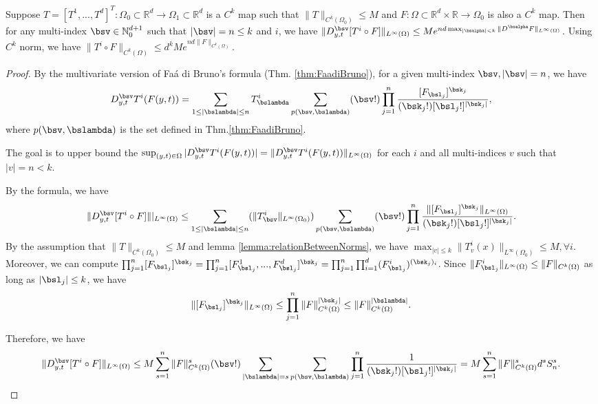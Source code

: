 \begin{theorem}\label{thm:compositionVelocityFieldNorm}
Suppose $T = [T^1, ..., T^d]^T:\Omega_0\subset\mathbb{R}^d\rightarrow\Omega_1\subset\mathbb{R}^d$ is a $C^k$ map such that $\|T\|_{C^k(\Omega_0)} \leq M$ and $F:\Omega\subset\mathbb{R}^d\times\mathbb{R}\rightarrow\Omega_0$ is also a $C^k$ map. Then for any multi-index $\bsv\in\mathbb{N}_0^{d+1}$ such that $|\bsv| = n \leq k$ and $i$, we have $\|D^\bsv_{y,t}[T^i\circ F]\|_{L^\infty(\Omega)} \leq Me^{nd\max_{|\bsalpha|<k}\|D^\bsalpha F\|_{L^\infty(\Omega)} } $. Using $C^k$ norm, we have $\|T^i\circ F\|_{C^k(\Omega)} \leq d^kMe^{nd\|F\|_{C^k(\Omega)}}$. 


\end{theorem}
\begin{proof}
By the multivariate version of Fa\'{a} di Bruno's formula (Thm. \ref{thm:FaadiBruno}), for a given multi-index $\bsv, |\bsv| = n$, we have $$D^\bsv_{y,t}T^i(F(y,t)) = \sum_{1\leq |\bslambda| \leq n}T^i_\bslambda\sum_{p(\bsv,\bslambda)} (\bsv!)\prod_{j=1}^n\frac{[F_{\bsl_j}]^{\bsk_j}}{(\bsk_j!)[\bsl_j!]^{|\bsk_j|}},$$ where $p(\bsv,\bslambda)$ is the set defined in Thm.\ref{thm:FaadiBruno}. 

The goal is to upper bound the $\sup_{(y,t)\in\Omega}|D^\bsv_{y,t}T^i(F(y,t))| = \|D^\bsv_{y,t}T^i(F(y,t))\|_{L^\infty(\Omega)}$ for each $i$ and all multi-indices $v$ such that $|v| = n < k$. 




By the formula, we have $$\|D^\bsv_{y,t}[T^i\circ F]\||_{L^\infty(\Omega)} \leq \sum_{1\leq |\bslambda| \leq n}(\|T^i_\bsv\|_{L^\infty(\Omega_0)})\sum_{p(\bsv,\bslambda)} (\bsv!)\prod_{j=1}^n\frac{\|[F_{\bsl_j}]^{\bsk_j}\|_{L^\infty(\Omega)}}{(\bsk_j!)[\bsl_j!]^{|\bsk_j|}}.$$ By the assumption that $\|T\|_{C^k(\Omega_0)}\leq M$ and lemma \ref{lemma:relationBetweenNorms}, we have $\max_{|v|\leq k} \|T^i_v(x)\|_{L^\infty(\Omega_0)}\leq M, \forall i.$ Moreover, we can compute $\prod_{j=1}^n[F_{\bsl_j}]^{\bsk_j} = \prod_{j=1}^n[F^1_{\bsl_j},...,F^d_{\bsl_j}]^{\bsk_j} = \prod_{j=1}^n\prod_{i=1}^d(F^i_{\bsl_j})^{(\bsk_j)_i}$. Since $\|F^i_{\bsl_j}\|_{L^\infty(\Omega)} \leq \|F\|_{C^k(\Omega)}$ as long as $|\bsl_j| \leq k$, we have 
$$\|[F_{\bsl_j}]^{\bsk_j}\|_{L^\infty(\Omega)} \leq \prod_{j=1}^n \|F\|_{C^k(\Omega)}^{|\bsk_j|} \leq  \|F\|_{C^k(\Omega)}^{|\bslambda|}.$$

Therefore, we have 
$$\|D^\bsv_{y,t}[T^i\circ F]\|_{L^\infty(\Omega)} \leq M \sum_{s = 1}^n\|F\|_{C^k(\Omega)}^{s}(\bsv!)\sum_{|\bslambda| = s}\sum_{p(\bsv,\bslambda)}\prod_{j=1}^n\frac{1}{(\bsk_j!)[\bsl_j!]^{|\bsk_j|}} =  M \sum_{s = 1}^n\|F\|_{C^k(\Omega)}^{s}d^sS_n^s.$$


\end{proof}
